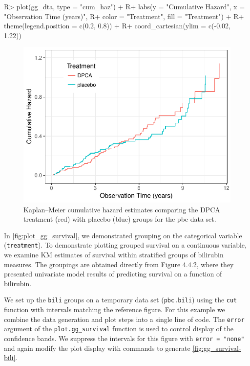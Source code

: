 \documentclass[article]{jss}
\begin{document}
\begin{Schunk}
\begin{Sinput}
R> plot(gg_dta, type = "cum_haz") +
R+   labs(y = "Cumulative Hazard", x = "Observation Time (years)",
R+        color = "Treatment", fill = "Treatment") +
R+   theme(legend.position = c(0.2, 0.8)) +
R+   coord_cartesian(ylim = c(-0.02, 1.22))
\end{Sinput}
\begin{figure}[!htb]

{\centering \includegraphics{rfs-plot_gg_cum_hazard-1} 

}

\caption[Kaplan--Meier cumulative hazard estimates comparing the DPCA treatment (red) with placebo (blue) groups for the pbc data set]{Kaplan--Meier cumulative hazard estimates comparing the DPCA treatment (red) with placebo (blue) groups for the pbc data set.}\label{fig:plot_gg_cum_hazard}
\end{figure}
\end{Schunk}

In \autoref{fig:plot_gg_survival}, we demonstrated grouping on the
categorical variable (\texttt{treatment}). To demonstrate plotting
grouped survival on a continuous variable, we examine KM estimates of
survival within stratified groups of bilirubin measures. The groupings
are obtained directly from\citep{fleming:1991} Figure 4.4.2, where they
presented univariate model results of predicting survival on a function
of bilirubin.

We set up the \texttt{bili} groups on a temporary data set
(\texttt{pbc.bili}) using the \texttt{cut} function with intervals
matching the reference figure. For this example we combine the data
generation and plot steps into a single line of code. The \texttt{error}
argument of the \texttt{plot.gg\_survival} function is used to control
display of the confidence bands. We suppress the intervals for this
figure with \texttt{error\ =\ "none"} and again modify the plot display
with  commands to generate \autoref{fig:gg_survival-bili}.
\end{document}
